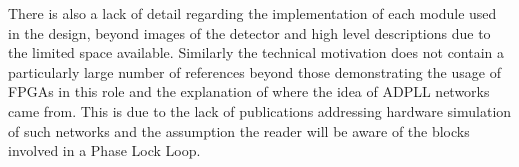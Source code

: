\documentclass[a4paper,12pt]{article}
\begin{document}
There is also a lack of detail regarding the implementation of each module used in the design, beyond images of the detector and high level descriptions due to the limited space available. Similarly the technical motivation does not contain a particularly large number of references beyond those demonstrating the usage of FPGAs in this role and the explanation of where the idea of ADPLL networks came from. This is due to the lack of publications addressing hardware simulation of such networks and the assumption the reader will be aware of the blocks involved in a Phase Lock Loop.
\end{document}
